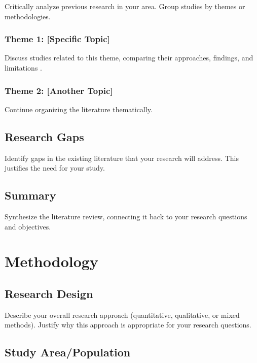 \documentclass[12pt, a4paper]{report}
\begin{document}
	Critically analyze previous research in your area. Group studies by themes or methodologies.
	
	\subsection{Theme 1: [Specific Topic]}
	
	Discuss studies related to this theme, comparing their approaches, findings, and limitations \citep{brown2021, taylor2020}.
	
	\subsection{Theme 2: [Another Topic]}
	
	Continue organizing the literature thematically.
	
	\section{Research Gaps}
	\label{sec:gaps}
	
	Identify gaps in the existing literature that your research will address. This justifies the need for your study.
	
	\section{Summary}
	
	Synthesize the literature review, connecting it back to your research questions and objectives.
	
	\chapter{Methodology}
	\label{chap:methodology}
	
	\section{Research Design}
	\label{sec:design}
	
	Describe your overall research approach (quantitative, qualitative, or mixed methods). Justify why this approach is appropriate for your research questions.
	
	\section{Study Area/Population}
	\label{sec:population}
	
\end{document}
